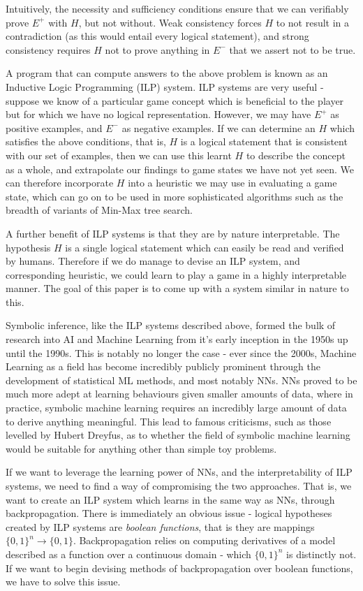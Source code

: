 \documentclass[conference]{report}
\begin{document}
Intuitively, the necessity and sufficiency conditions ensure that we can verifiably prove $E^+$ with $H$, but not without. Weak consistency forces $H$ to not result in a contradiction (as this would entail every logical statement), and strong consistency requires $H$ not to prove anything in $E^-$ that we assert not to be true.

A program that can compute answers to the above problem is known as an Inductive Logic Programming (ILP) system. ILP systems are very useful - suppose we know of a particular game concept which is beneficial to the player but for which we have no logical representation. However, we may have $E^+$ as positive examples, and $E^-$ as negative examples. If we can determine an $H$ which satisfies the above conditions, that is, $H$ is a logical statement that is consistent with our set of examples, then we can use this learnt $H$ to describe the concept as a whole, and extrapolate our findings to game states we have not yet seen. We can therefore incorporate $H$ into a heuristic we may use in evaluating a game state, which can go on to be used in more sophisticated algorithms such as the breadth of variants of Min-Max tree search.

A further benefit of ILP systems is that they are by nature interpretable. The hypothesis $H$ is a single logical statement which can easily be read and verified by humans. Therefore if we do manage to devise an ILP system, and corresponding heuristic, we could learn to play a game in a highly interpretable manner. The goal of this paper is to come up with a system similar in nature to this.

Symbolic inference, like the ILP systems described above, formed the bulk of research into AI and Machine Learning from it's early inception in the 1950s up until the 1990s. This is notably no longer the case - ever since the 2000s, Machine Learning as a field has become incredibly publicly prominent through the development of statistical ML methods, and most notably NNs. NNs proved to be much more adept at learning behaviours given smaller amounts of data, where in practice, symbolic machine learning requires an incredibly large amount of data to derive anything meaningful. This lead to famous criticisms, such as those levelled by Hubert Dreyfus, as to whether the field of symbolic machine learning would be suitable for anything other than simple toy problems.  

If we want to leverage the learning power of NNs, and the interpretability of ILP systems, we need to find a way of compromising the two approaches. That is, we want to create an ILP system which learns in the same way as NNs, through backpropagation. There is immediately an obvious issue - logical hypotheses created by ILP systems are \textit{boolean functions}, that is they are mappings $\{0,1\}^n \to \{0,1\}$. Backpropagation relies on computing derivatives of a model described as a function over a continuous domain - which $\{0,1\}^n$ is distinctly not. If we want to begin devising methods of backpropagation over boolean functions, we have to solve this issue. 
\end{document}
